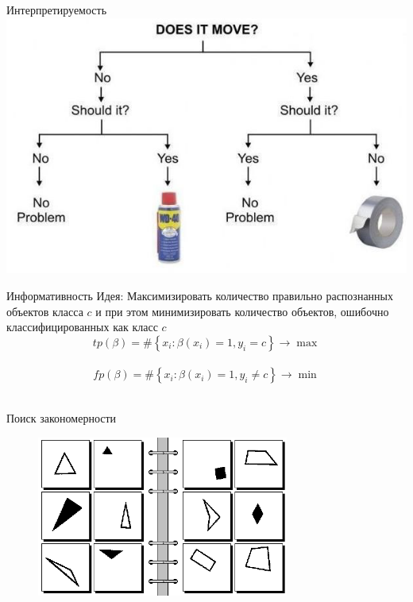 \documentclass[10pt]{beamer}
\begin{document}
\begin{frame}{Интерпретируемость}
    \centering
	\includegraphics[width=\textwidth, height=0.8 \textheight, keepaspectratio]{images/decisiontree}
\end{frame}


\begin{frame}{Информативность}
  \alert{Идея}: Максимизировать количество правильно распознанных объектов класса $c$ и при этом минимизировать количество объектов, ошибочно классифицированных как класс $c$
  \pause
	\bigbreak
	$${ tp(\beta) = \# \left\{ x_i: \beta(x_i) = 1 , y_i = c \right\} \rightarrow \max }$$\\
	\pause
  \bigbreak
	$${ fp(\beta) = \# \left\{ x_i: \beta(x_i) = 1 , y_i \neq c \right\} \rightarrow \min }$$\\		
\end{frame}

\begin{frame}{Поиск закономерности}
	\begin{figure}[htbp]
	  \includegraphics[height=150pt, keepaspectratio = true]{images/bongard6}   
	\end{figure}
\end{frame}
\end{document}
